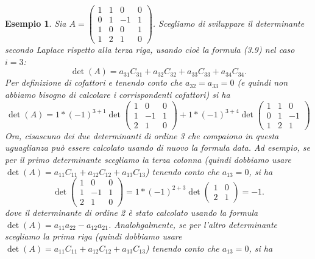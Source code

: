 \documentclass{book}
\newtheorem{esempio}{Esempio}
\begin{document}
\begin{esempio}
  Sia $A=\begin{pmatrix} 1 & 1 & 0 & 0 \\ 0 & 1 & -1 & 1 \\ 1 & 0 & 0 & 1 \\ 1 & 2 & 1 & 0\end{pmatrix}$. Scegliamo di sviluppare il determinante secondo Laplace rispetto alla terza riga, usando cioè la formula (3.9) nel caso $i = 3$:
  \begin{equation*}
    \det (A)=a_{31}C_{31}+a_{32}C_{32}+a_{33}C_{33}+a_{34}C_{34}.
  \end{equation*}
  Per definizione di cofattori e tenendo conto che $a_{32}=a_{33}=0$ (e quindi non abbiamo bisogno di calcolare i corrispondenti cofattori) si ha
  \begin{equation}
	\det(A)=1*(-1)^{3+1}\det\begin{pmatrix} 1 & 0 & 0 \\ 1 & -1 & 1 \\ 2 & 1 & 0\end{pmatrix} + 1*(-1)^{3+4}\det\begin{pmatrix} 1 & 1 & 0 \\ 0 & 1 & -1 \\ 1 & 2 & 1\end{pmatrix}
  \end{equation}
  Ora, cisascuno dei due determinanti di ordine 3 che compaiono in questa uguaglianza può essere calcolato usando di nuovo la formula data. Ad esempio, se per il primo determinante scegliamo la terza colonna (quindi dobbiamo usare $\det (A)=a_{11}C_{11}+a_{12}C_{12}+a_{13}C_{13}$) tenendo conto che $a_{13}=0$, si ha
  \begin{equation*}
	\det\begin{pmatrix} 1 & 0 & 0 \\ 1 & -1 & 1 \\ 2 & 1 & 0\end{pmatrix}=1*(-1)^{2+3}\det\begin{pmatrix} 1 & 0 \\ 2 & 1 \end{pmatrix}=-1.
  \end{equation*}
  dove il determinante di ordine 2 è stato calcolato usando la formula $\det(A)=a_{11}a_{22}-a_{12}a_{21}$.
  Analohgalmente, se per l'altro determinante scegliamo la prima riga (quindi dobbiamo usare
  $\det (A)=a_{11}C_{11}+a_{12}C_{12}+a_{13}C_{13}$) tenendo conto che $a_{13}=0$, si ha
  \begin{equation*}

\end{equation*}
\end{esempio}
\end{document}
